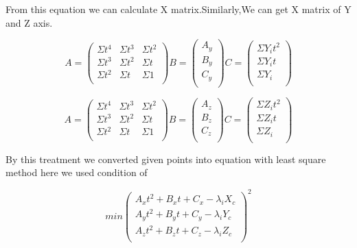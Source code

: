 From this equation we can calculate X matrix.Similarly,We can get X matrix of Y and Z axis.

\begin{equation}
A = 
\begin{pmatrix}
  \Sigma t^4 & \Sigma t^3 & \Sigma t^2\\
  \Sigma t^3 & \Sigma t^2 & \Sigma t\\
  \Sigma t^2 & \Sigma t & \Sigma 1\\
 \end{pmatrix}
B = 
\begin{pmatrix}
  A_y \\
  B_y \\
  C_y \\
 \end{pmatrix}
 C = 
\begin{pmatrix}
  \Sigma Y_i t ^2 \\
  \Sigma Y_i t \\
  \Sigma Y_i \\
 \end{pmatrix}
\end{equation}

\begin{equation}
A = 
\begin{pmatrix}
  \Sigma t^4 & \Sigma t^3 & \Sigma t^2\\
  \Sigma t^3 & \Sigma t^2 & \Sigma t\\
  \Sigma t^2 & \Sigma t & \Sigma 1\\
 \end{pmatrix}
B = 
\begin{pmatrix}
  A_z \\
  B_z \\
  C_z \\
 \end{pmatrix}
 C = 
\begin{pmatrix}
  \Sigma Z_i t ^2 \\
  \Sigma Z_i t \\
  \Sigma Z_i \\
 \end{pmatrix}
\end{equation}

By this treatment we converted given points into equation with least square method here we used condition of 

\begin{equation}
min
\begin{pmatrix}
  A_x t^2 + B_x t + C_x -\lambda_i X_c \\
  A_y t^2 + B_y t + C_y -\lambda_i Y_c \\
  A_z t^2 + B_z t + C_z -\lambda_i Z_c \\
 \end{pmatrix}^2
 \end{equation}
 
